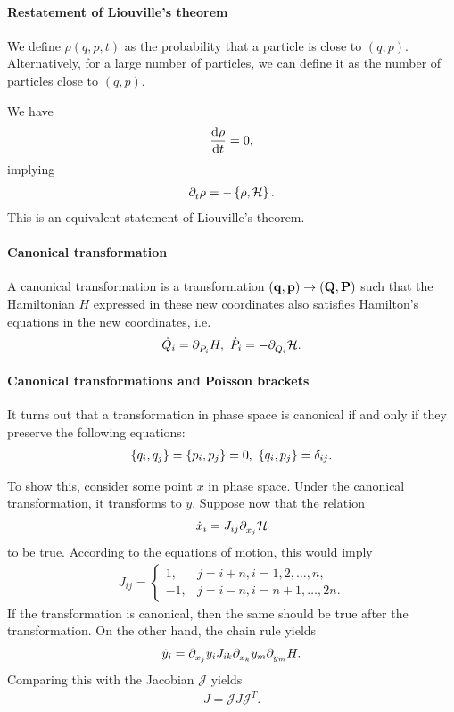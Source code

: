 \paragraph{Restatement of Liouville's theorem}
We define $\rho(q, p, t)$ as the probability that a particle is close to $(q, p)$. Alternatively, for a large number of particles, we can define it as the number of particles close to $(q, p)$.

We have
\begin{align*}
	\dv{\rho}{t} = 0,
\end{align*}
implying
\begin{align*}
	\partial^{}_{t}\rho = -\left\{\rho, \mathcal{H}\right\}.
\end{align*}
This is an equivalent statement of Liouville's theorem.

\paragraph{Canonical transformation}
A canonical transformation is a transformation $(\vb{q}, \vb{p})\to (\vb{Q}, \vb{P})$ such that the Hamiltonian $H$ expressed in these new coordinates also satisfies Hamilton's equations in the new coordinates, i.e.
\begin{align*}
	\dot{Q}_{i} = \partial^{}_{P_{i}}H,\ \dot{P}_{i} = -\partial^{}_{Q_{i}}\mathcal{H}.
\end{align*}

\paragraph{Canonical transformations and Poisson brackets}
It turns out that a transformation in phase space is canonical if and only if they preserve the following equations:
\begin{align*}
	\left\{q_{i}, q_{j}\right\} = \left\{p_{i}, p_{j}\right\} = 0,\ \left\{q_{i}, p_{j}\right\} = \delta_{ij}.
\end{align*}

To show this, consider some point $x$ in phase space. Under the canonical transformation, it transforms to $y$. Suppose now that the relation
\begin{align*}
	\dot{x}_{i} = J_{ij}\partial^{}_{x_{j}}\mathcal{H}
\end{align*}
to be true. According to the equations of motion, this would imply
\begin{align*}
	J_{ij} = 
	\begin{cases}
		 1, &j = i + n, i = 1, 2, \dots, n, \\
		-1, &j = i - n, i = n + 1, \dots, 2n.
	\end{cases}
\end{align*}
If the transformation is canonical, then the same should be true after the transformation. On the other hand, the chain rule yields
\begin{align*}
	\dot{y}_{i} = \partial^{}_{x_{j}}y_{i}J_{ik}\partial^{}_{x_{k}}y_{m}\partial^{}_{y_{m}}H.
\end{align*}
Comparing this with the Jacobian $\mathcal{J}$ yields
\begin{align*}
	J = \mathcal{J}J\mathcal{J}^{T}.
\end{align*}

